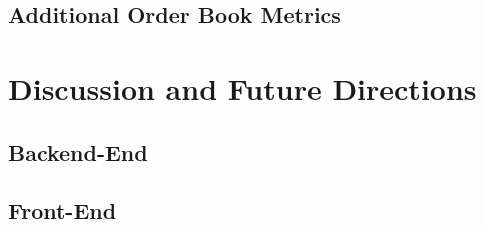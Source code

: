 \subsection{Additional Order Book Metrics}


\section{Discussion and Future Directions}


\subsection{Backend-End}

\subsection{Front-End}
